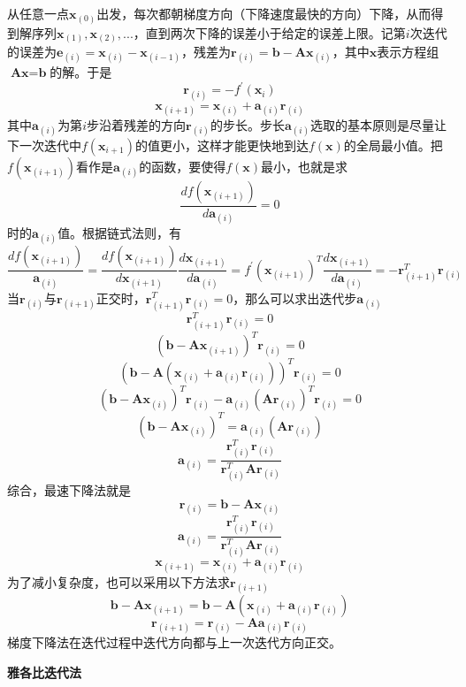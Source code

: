 \documentclass{article}
\begin{document}
					从任意一点$\textbf{x}_{(0)}$出发，每次都朝梯度方向（下降速度最快的方向）下降，从而得到解序列$\textbf{x}_{(1)}, \textbf{x}_{(2)},...$，直到两次下降的误差小于给定的误差上限。记第$i$次迭代的误差为$\textbf{e}_{(i)}=\textbf{x}_{(i)}-\textbf{x}_{(i-1)}$，残差为$\textbf{r}_{(i)}=\textbf{b}-\textbf{A}\textbf{x}_{(i)}$，其中$\textbf{x}$表示方程组$\textbf{A}\textbf{x}=\textbf{b}$的解。于是
					$$\textbf{r}_{(i)}=-f^{'}(\textbf{x}_{i})$$
					$$\textbf{x}_{(i+1)}=\textbf{x}_{(i)}+\textbf{a}_{(i)}\textbf{r}_{(i)}$$
					其中$\textbf{a}_{(i)}$为第$i$步沿着残差的方向$\textbf{r}_{(i)}$的步长。步长$\textbf{a}_{(i)}$选取的基本原则是尽量让下一次迭代中$f(\textbf{x}_{i+1})$的值更小，这样才能更快地到达$f(\textbf{x})$的全局最小值。把$f(\textbf{x}_{(i+1)})$看作是$\textbf{a}_{(i)}$的函数，要使得$f(\textbf{x})$最小，也就是求
					$$\frac{df(\textbf{x}_{(i+1)})}{d\textbf{a}_{(i)}}=0$$
					时的$\textbf{a}_{(i)}$值。根据链式法则，有
					$$\frac{df(\textbf{x}_{(i+1)})}{\textbf{a}_{(i)}}=\frac{df(\textbf{x}_{(i+1)})}{d\textbf{x}_{(i+1)}}\frac{d\textbf{x}_{(i+1)}}{d\textbf{a}_{(i)}}=f^{'}(\textbf{x}_{(i+1)})^{T}\frac{d\textbf{x}_{(i+1)}}{d\textbf{a}_{(i)}}=-\textbf{r}_{(i+1)}^{T}\textbf{r}_{(i)}$$
					当$\textbf{r}_{(i)}$与$\textbf{r}_{(i+1)}$正交时，$\textbf{r}_{(i+1)}^{T}\textbf{r}_{(i)}=0$，那么可以求出迭代步$\textbf{a}_{(i)}$
					$$\textbf{r}_{(i+1)}^{T}\textbf{r}_{(i)}=0$$
					$$(\textbf{b}-\textbf{A}\textbf{x}_{(i+1)})^{T}\textbf{r}_{(i)}=0$$
					$$(\textbf{b}-\textbf{A}(\textbf{x}_{(i)}+\textbf{a}_{(i)}\textbf{r}_{(i)}))^{T}\textbf{r}_{(i)}=0$$
					$$(\textbf{b}-\textbf{A}\textbf{x}_{(i)})^{T}\textbf{r}_{(i)}-\textbf{a}_{(i)}(\textbf{A}\textbf{r}_{(i)})^{T}\textbf{r}_{(i)}=0$$
					$$(\textbf{b}-\textbf{A}\textbf{x}_{(i)})^{T}=\textbf{a}_{(i)}(\textbf{A}\textbf{r}_{(i)})$$
					$$\textbf{a}_{(i)}=\frac{\textbf{r}^{T}_{(i)}\textbf{r}_{(i)}}{\textbf{r}^{T}_{(i)}\textbf{A}\textbf{r}_{(i)}}$$
					综合，最速下降法就是
					$$\textbf{r}_{(i)}=\textbf{b}-\textbf{A}\textbf{x}_{(i)}$$
					$$\textbf{a}_{(i)}=\frac{\textbf{r}^{T}_{(i)}\textbf{r}_{(i)}}{\textbf{r}^{T}_{(i)}\textbf{A}\textbf{r}_{(i)}}$$
					$$\textbf{x}_{(i+1)}=\textbf{x}_{(i)}+\textbf{a}_{(i)}\textbf{r}_{(i)}$$
					为了减小复杂度，也可以采用以下方法求$\textbf{r}_{(i+1)}$
					$$\textbf{b}-\textbf{A}\textbf{x}_{(i+1)}=\textbf{b}-\textbf{A}(\textbf{x}_{(i)}+\textbf{a}_{(i)}\textbf{r}_{(i)})$$
					$$\textbf{r}_{(i+1)}=\textbf{r}_{(i)}-\textbf{A}\textbf{a}_{(i)}\textbf{r}_{(i)}$$
					梯度下降法在迭代过程中迭代方向都与上一次迭代方向正交。
					
					\textbf{雅各比迭代法}
					
\end{document}
